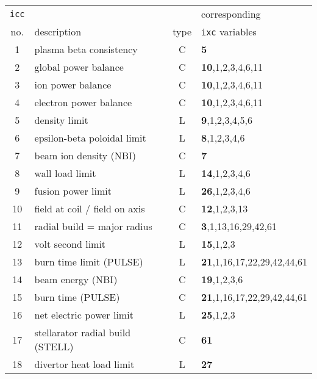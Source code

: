 \documentclass[11pt,a4paper]{report}
\begin{document}
\begin{table}[tbph]
\begin{center}
\begin{tabular}{||c|l|c|l||} \hline
{\tt icc} &                                               &      & corresponding \\
no. & description                                         & type & {\tt ixc} variables \\ \hline
1   & plasma beta consistency                             & C    & {\bf 5} \\
2   & global power balance                                & C    & {\bf 10},1,2,3,4,6,11 \\
3   & ion power balance                                   & C    & {\bf 10},1,2,3,4,6,11 \\
4   & electron power balance                              & C    & {\bf 10},1,2,3,4,6,11 \\
5   & density limit                                       & L    & {\bf 9},1,2,3,4,5,6 \\
6   & epsilon-beta poloidal limit                         & L    & {\bf 8},1,2,3,4,6 \\
7   & beam ion density (NBI)                              & C    & {\bf 7} \\
8   & wall load limit                                     & L    & {\bf 14},1,2,3,4,6 \\
9   & fusion power limit                                  & L    & {\bf 26},1,2,3,4,6 \\
10  & field at coil / field on axis                       & C    & {\bf 12},1,2,3,13 \\
11  & radial build = major radius                         & C    & {\bf 3},1,13,16,29,42,61 \\
12  & volt second limit                                   & L    & {\bf 15},1,2,3 \\
13  & burn time limit (PULSE)                             & L    & {\bf 21},1,16,17,22,29,42,44,61 \\
14  & beam energy (NBI)                                   & C    & {\bf 19},1,2,3,6 \\
15  & burn time (PULSE) 			          & C    & {\bf 21},1,16,17,22,29,42,44,61 \\
16  & net electric power limit                            & L    & {\bf 25},1,2,3 \\
17  & stellarator radial build (STELL)                    & C    & {\bf 61} \\
18  & divertor heat load limit                            & L    & {\bf 27} \\

\end{tabular}
\end{center}
\end{table}
\end{document}
